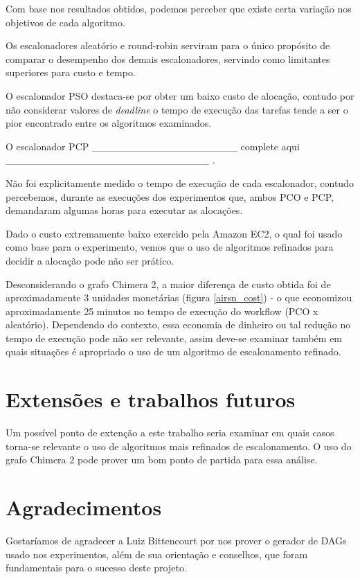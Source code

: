 \documentclass[a4paper,10pt]{article}
\begin{document}
Com base nos resultados obtidos, podemos perceber que existe certa variação nos
objetivos de cada algoritmo.

Os escalonadores aleatório e round-robin serviram para o único propósito de comparar
o desempenho dos demais escalonadores, servindo como limitantes superiores para custo
e tempo.

O escalonador PSO destaca-se por obter um baixo custo de alocação, contudo por não considerar
valores de \emph{deadline} o tempo de execução das tarefas tende a ser o pior encontrado
entre os algoritmos examinados.

O escalonador PCP ____________________ complete aqui ____________________________ .

Não foi explicitamente medido o tempo de execução de cada escalonador, contudo percebemos,
durante as execuções dos experimentos que, ambos PCO e PCP, demandaram algumas horas para
executar as alocações.

Dado o custo extremamente baixo exercido pela Amazon EC2, o qual foi usado como base para
o experimento, vemos que o uso de algoritmos refinados para decidir a alocação pode não ser
prático.

Desconsiderando o grafo Chimera 2, a maior diferença de custo obtida foi de aproximadamente
3 unidades monetárias (figura \ref{airsn_cost}) - o que economizou aproximadamente
25 minutos no tempo de execução do workflow (PCO x aleatório).
Dependendo do contexto, essa economia de dinheiro ou tal redução no tempo de execução pode não
ser relevante, assim deve-se examinar também em quais situações é apropriado o uso de um algoritmo
de escalonamento refinado.

\section{Extensões e trabalhos futuros}

Um possível ponto de extenção a este trabalho seria examinar em quais casos torna-se relevante o uso
de algoritmos mais refinados de escalonamento. O uso do grafo Chimera 2 pode prover um bom ponto de
partida para essa análise.

\section{Agradecimentos}

Gostaríamos de agradecer a Luiz Bittencourt por nos
prover o gerador de DAGs usado nos experimentos, além de sua orientação e
conselhos, que foram fundamentais para o sucesso deste projeto.
\end{document}
